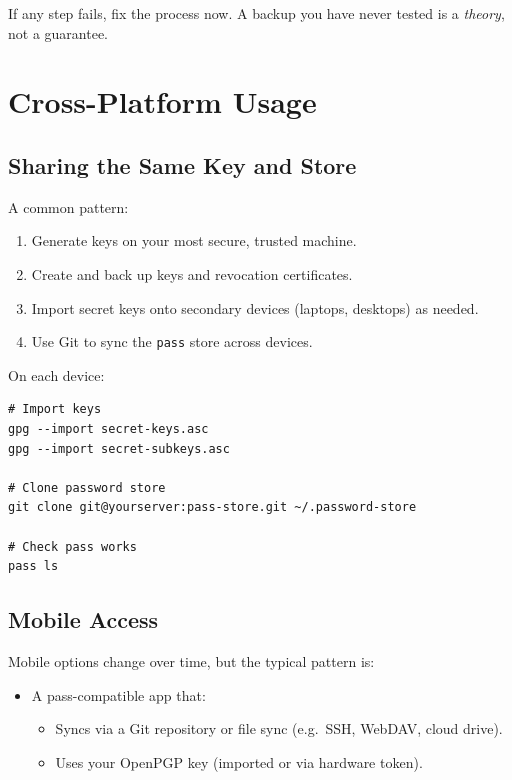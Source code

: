\documentclass[11pt,a4paper]{article}
\begin{document}
If any step fails, fix the process now. A backup you have never tested is a \emph{theory}, not a guarantee.

\section{Cross-Platform Usage}

\subsection{Sharing the Same Key and Store}

A common pattern:

\begin{enumerate}[noitemsep]
  \item Generate keys on your most secure, trusted machine.
  \item Create and back up keys and revocation certificates.
  \item Import secret keys onto secondary devices (laptops, desktops) as needed.
  \item Use Git to sync the \texttt{pass} store across devices.
\end{enumerate}

On each device:

\begin{verbatim}
# Import keys
gpg --import secret-keys.asc
gpg --import secret-subkeys.asc

# Clone password store
git clone git@yourserver:pass-store.git ~/.password-store

# Check pass works
pass ls
\end{verbatim}

\subsection{Mobile Access}

Mobile options change over time, but the typical pattern is:

\begin{itemize}[noitemsep]
  \item A pass-compatible app that:
    \begin{itemize}[noitemsep]
      \item Syncs via a Git repository or file sync (e.g.\ SSH, WebDAV, cloud drive).
      \item Uses your OpenPGP key (imported or via hardware token).
    \end{itemize}
\end{itemize}
\end{document}
